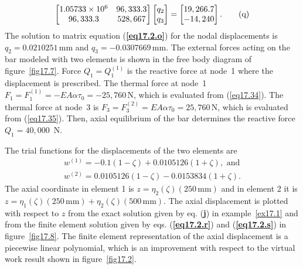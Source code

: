 \documentclass{AeroStructure-ERJohnson}
\begin{document}
\begin{example}
\begin{equation}
\left[\begin{array}{@{}cc@{}}1.05733 \times 10^{6} & 96,333.3 \\96,333.3 & 528,667\end{array}\right]\left[\begin{array}{@{}l@{}}q_{2} \\q_{3}\end{array}\right]=\left[\begin{array}{@{}l@{}}19,266.7 \\-14,240\end{array}\right]. \label{eq17.2.q}\tag{q}
\end{equation}
The solution to matrix equation (\textbf{\ref{eq17.2.o}}) for the nodal displacements is $q_{2}=0.0210251\,\mathrm{mm}$ and $q_{3}=-0.0307669\,\mathrm{mm}$. The external forces acting on the bar modeled with two elements is shown in the free body diagram of figure~\ref{fig17.7}. Force $Q_{1}=Q_{1}^{(1)}$ is the reactive force at node~1 where the displacement is prescribed. The thermal force at node~1 $F_{1}=F_{1}^{(1)}=-E A \alpha \tau_{0}=-25{,}760\,\mathrm{N}$, which is evaluated from (\ref{eq17.34}). The thermal force at node~3 is $F_{3}=F_{3}^{(2)}=E A \alpha \tau_{0}=25{,}760\,\mathrm{N}$, which is evaluated from (\ref{eq17.35}). Then, axial equilibrium of the bar determines the reactive force $\textit{Q}_1 = 40{,}000$~N.



The trial functions for the displacements of the two elements are
\begin{gather}
w^{(1)}=-0.1(1-\zeta)+0.0105126(1+\zeta), \textrm{ and}\label{eq17.2.r}\tag{r}\\
w^{(2)}=0.0105126(1-\zeta)-0.0153834(1+\zeta). \label{eq17.2.s}\tag{s}
\end{gather}
The axial coordinate in element 1 is $z=\eta_{2}(\zeta)(250\,\mathrm{mm})$ and in element 2 it is $z=\eta_{1}(\zeta)(250\,\mathrm{mm})+\eta_{2}(\zeta)(500\,\mathrm{mm})$. The axial displacement is plotted with respect to $z$ from the exact solution given by eq. (\textbf{j}) in example~\ref{ex17.1} and from the finite element solution given by eqs. (\textbf{\ref{eq17.2.r}}) and (\textbf{\ref{eq17.2.s}}) in figure~\ref{fig17.8}. The finite element representation of the axial displacement is a piecewise linear polynomial, which is an improvement with respect to the virtual work result shown in figure~\ref{fig17.2}.


\end{example}
\end{document}
